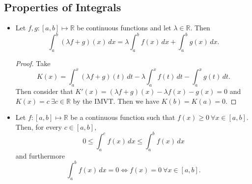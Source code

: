 \documentclass{article}
\newcommand{\R}{\mathbb{R}}
\newcommand{\?}{\stackrel{?}{=}}
\theoremstyle{definition} %
\begin{document}
\subsection{Properties of Integrals}

\begin{itemize}
    \item[]
    \begin{lemma}
        Let $f, g: [a, b] \mapsto \R$ be continuous functions and let $\lambda \in \R$. Then
        $$\int_a^b (\lambda f + g)(x) \,dx = \lambda \int_a^b f(x) \,dx + \int_a^b g(x) \,dx.$$
    \end{lemma}
    \begin{proof}
        Take
        $$K(x) = \int_a^x (\lambda f + g)(t) \,dt - \lambda \int_a^x f(t) \,dt - \int_a^x g(t) \,dt.$$
        Then consider that $K'(x) = (\lambda f + g)(x) - \lambda f(x) - g(x) = 0$ and $K(x) = c \ \exists c \in \R$ by the IMVT. Then we have $K(b) = K(a) = 0$.
    \end{proof}
    \item[]
    \begin{lemma}
        Let $f: [a, b] \mapsto \R$ be a continuous function such that $f(x) \geq 0 \ \forall x \in [a, b]$. Then, for every $c \in [a, b]$,
        $$0 \leq \int_a^c f(x) \,dx \leq \int_a^b f(x) \,dx$$
        and furthermore
        $$\int_a^b f(x) \,dx = 0 \iff f(x) = 0 \ \forall x \in [a, b].$$
    \end{lemma}
\end{itemize}

\newpage

\listoftheorems[]
\end{document}
